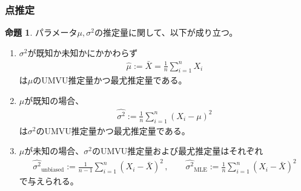 \documentclass[11pt]{ltjsarticle}
\theoremstyle{definition}
\newtheorem{proposition}[theorem]{命題}
\begin{document}
\subsubsection{点推定}
\begin{proposition}
    パラメータ$\mu,\sigma^2$の推定量に関して、以下が成り立つ。
    \begin{enumerate}[(1)]
        \item $\sigma^2$が既知か未知かにかかわらず
        \begin{align}
            \widehat{\mu} := \bar{X} = \frac{1}{n}\sum_{i=1}^n X_i
        \end{align}
        は$\mu$のUMVU推定量かつ最尤推定量である。
        \item $\mu$が既知の場合、
        \begin{align}
            \widehat{\sigma^2} :=\frac{1}{n}\sum_{i=1}^n(X_i - \mu)^2
        \end{align}
        は$\sigma^2$のUMVU推定量かつ最尤推定量である。
        \item $\mu$が未知の場合、$\sigma^2$のUMVU推定量および最尤推定量はそれぞれ
        \begin{align}
            \widehat{\sigma^2}_{\text{unbiased}} :=\frac{1}{n-1}\sum_{i=1}^n(X_i-\bar{X})^2\, , \qquad \widehat{\sigma^2}_{\text{MLE}} :=\frac{1}{n}\sum_{i=1}^n(X_i-\bar{X})^2
        \end{align}
        で与えられる。
    \end{enumerate}
\end{proposition}
\end{document}

